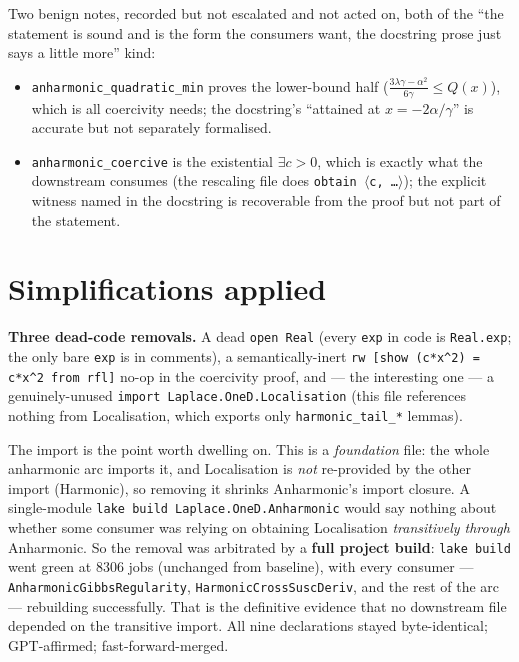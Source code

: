 \documentclass[11pt]{article}
\begin{document}
Two benign notes, recorded but not escalated and not acted on, both of the ``the statement is sound and is the
form the consumers want, the docstring prose just says a little more'' kind:
\begin{itemize}[noitemsep]
  \item \texttt{anharmonic\_quadratic\_min} proves the lower-bound half ($\tfrac{3\lambda\gamma-\alpha^2}{6\gamma}\le
    Q(x)$), which is all coercivity needs; the docstring's ``attained at $x=-2\alpha/\gamma$'' is accurate but
    not separately formalised.
  \item \texttt{anharmonic\_coercive} is the existential $\exists c>0$, which is exactly what the downstream
    consumes (the rescaling file does \texttt{obtain $\langle$c, \dots$\rangle$}); the explicit witness named
    in the docstring is recoverable from the proof but not part of the statement.
\end{itemize}

\section{Simplifications applied}
\textbf{Three dead-code removals.} A dead \texttt{open Real} (every \texttt{exp} in code is \texttt{Real.exp};
the only bare \texttt{exp} is in comments), a semantically-inert \texttt{rw [show (c*x\^{}2) = c*x\^{}2 from rfl]}
no-op in the coercivity proof, and --- the interesting one --- a genuinely-unused
\texttt{import Laplace.OneD.Localisation} (this file references nothing from Localisation, which exports only
\texttt{harmonic\_tail\_*} lemmas).

The import is the point worth dwelling on. This is a \emph{foundation} file: the whole anharmonic arc imports
it, and Localisation is \emph{not} re-provided by the other import (Harmonic), so removing it shrinks
Anharmonic's import closure. A single-module \texttt{lake build Laplace.OneD.Anharmonic} would say nothing
about whether some consumer was relying on obtaining Localisation \emph{transitively through} Anharmonic. So
the removal was arbitrated by a \textbf{full project build}: \texttt{lake build} went green at $8306$ jobs
(unchanged from baseline), with every consumer --- \texttt{AnharmonicGibbsRegularity},
\texttt{HarmonicCrossSuscDeriv}, and the rest of the arc --- rebuilding successfully. That is the definitive
evidence that no downstream file depended on the transitive import. All nine declarations stayed
byte-identical; GPT-affirmed; fast-forward-merged.
\end{document}
